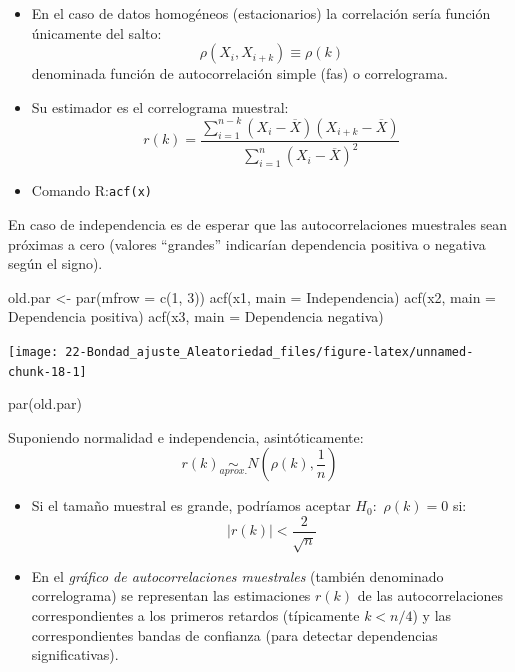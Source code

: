 \documentclass[
]{book}
\newenvironment{Shaded}{\begin{snugshade}}{\end{snugshade}}
\newcommand{\AttributeTok}[1]{\textcolor[rgb]{0.77,0.63,0.00}{#1}}
\newcommand{\DecValTok}[1]{\textcolor[rgb]{0.00,0.00,0.81}{#1}}
\newcommand{\FunctionTok}[1]{\textcolor[rgb]{0.00,0.00,0.00}{#1}}
\newcommand{\NormalTok}[1]{#1}
\newcommand{\OtherTok}[1]{\textcolor[rgb]{0.56,0.35,0.01}{#1}}
\newcommand{\StringTok}[1]{\textcolor[rgb]{0.31,0.60,0.02}{#1}}
\theoremstyle{break}
\theoremstyle{nonumberplain}
\begin{document}
\begin{itemize}
\item
  En el caso de datos homogéneos (estacionarios) la correlación sería función únicamente del salto:
  \[\rho\left(  X_{i},X_{i+k}\right)  \equiv\rho\left(  k\right)\]
  denominada función de autocorrelación simple (fas) o correlograma.
\item
  Su estimador es el correlograma muestral:
  \[r(k)=\frac{\sum_{i=1}^{n-k}(X_{i}-\overline{X})(X_{i+k}-\overline{X})}
  {\sum_{i=1}^{n}(X_{i}-\overline{X})^{2}}\]
\item
  Comando R:\texttt{acf(x)}
\end{itemize}

En caso de independencia es de esperar que las autocorrelaciones
muestrales sean próximas a cero (valores ``grandes'' indicarían
dependencia positiva o negativa según el signo).

\begin{Shaded}
\begin{Highlighting}[]
\NormalTok{old.par }\OtherTok{\textless{}{-}} \FunctionTok{par}\NormalTok{(}\AttributeTok{mfrow =} \FunctionTok{c}\NormalTok{(}\DecValTok{1}\NormalTok{, }\DecValTok{3}\NormalTok{))}
\FunctionTok{acf}\NormalTok{(x1, }\AttributeTok{main =} \StringTok{\textquotesingle{}Independencia\textquotesingle{}}\NormalTok{)}
\FunctionTok{acf}\NormalTok{(x2, }\AttributeTok{main =} \StringTok{\textquotesingle{}Dependencia positiva\textquotesingle{}}\NormalTok{)}
\FunctionTok{acf}\NormalTok{(x3, }\AttributeTok{main =} \StringTok{\textquotesingle{}Dependencia negativa\textquotesingle{}}\NormalTok{)}
\end{Highlighting}
\end{Shaded}

\begin{center}\texttt{[image: 22-Bondad\_ajuste\_Aleatoriedad\_files/figure-latex/unnamed-chunk-18-1]} \end{center}

\begin{Shaded}
\begin{Highlighting}[]
\FunctionTok{par}\NormalTok{(old.par)}
\end{Highlighting}
\end{Shaded}

Suponiendo normalidad e independencia, asintóticamente:
\[r(k)\underset{aprox.}{\sim}N\left(  \rho(k),\frac{1}{n}\right)\]

\begin{itemize}
\item
  Si el tamaño muestral es grande, podríamos aceptar \(H_{0}:\)
  \(\rho\left( k\right) = 0\) si:\[|r(k)|<\dfrac{2}{\sqrt{n}}\]
\item
  En el \emph{gráfico de autocorrelaciones muestrales} (también
  denominado correlograma) se representan las estimaciones \(r(k)\)
  de las autocorrelaciones correspondientes a los primeros retardos
  (típicamente \(k<n/4\)) y las correspondientes bandas de confianza
  (para detectar dependencias significativas).
\end{itemize}
\end{document}
